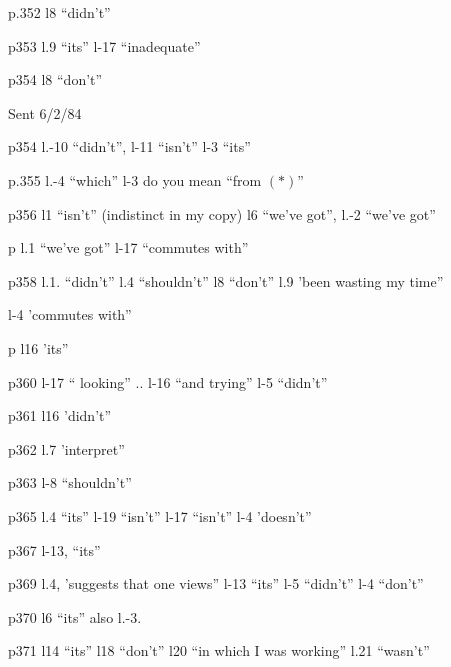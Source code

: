 p.352 l8 ``didn't''

p353 l.9 ``its'' l-17 ``inadequate''

p354 l8 ``don't''

Sent 6/2/84


p354 l.-10 ``didn't'', l-11 ``isn't'' l-3 ``its''

p.355 l.-4 ``which'' l-3 do you mean ``from $(*)$''

p356 l1 ``isn't'' (indistinct in my copy) l6 ``we've got'',  l.-2 ``we've got''

p l.1 ``we've got''  l-17 ``commutes with''

p358 l.1. ``didn't'' l.4 ``shouldn't'' l8 ``don't'' l.9 'been wasting my time''

l-4 'commutes with''

p l16 'its''

p360 l-17 `` looking'' .. l-16 ``and trying'' l-5 ``didn't''

p361 l16 'didn't''

p362 l.7 'interpret''

p363 l-8 ``shouldn't''

p365 l.4 ``its'' l-19 ``isn't'' l-17 ``isn't'' l-4 'doesn't''

p367 l-13, ``its''

p369 l.4, 'suggests that one views'' l-13 ``its'' l-5 ``didn't'' l-4 ``don't''

p370 l6 ``its'' also l.-3.

p371 l14 ``its'' l18 ``don't'' l20 ``in which I was working'' l.21 ``wasn't''


